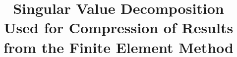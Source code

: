 \documentclass[preprint,12pt]{elsarticle}
\begin{document}
\begin{frontmatter}


\title{Singular Value Decomposition Used for Compression of Results from the Finite Element Method}




\author{}
\address{Prague, Czech Republic}


\end{frontmatter}
\end{document}
